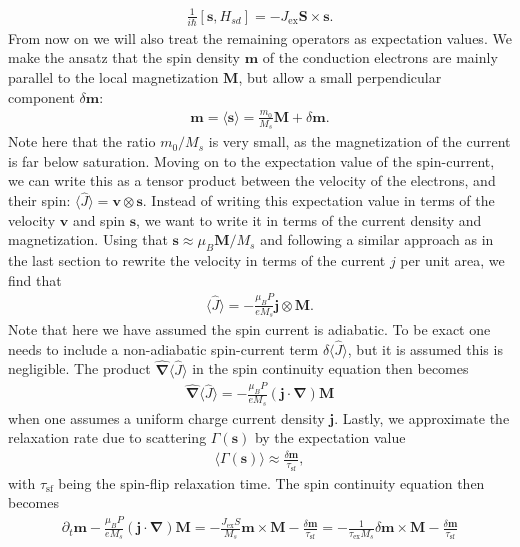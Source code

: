 \begin{align}
\frac{1}{i\hbar}\left[\mathbold{s}, H_{sd}\right] = -J_{\textrm{ex}}\mathbold{S}\times\mathbold{s}.
\end{align}
From now on we will also treat the remaining operators as expectation values. We make the ansatz that the spin density $\mathbold{m}$ of the conduction electrons are mainly parallel to the local magnetization $\mathbold{M}$, but allow a small perpendicular component $\delta\mathbold{m}$:
\begin{align}
    \mathbold{m} = \langle\mathbold{s}\rangle = \frac{m_0}{M_s} \mathbold{M} + \delta\mathbold{m}.
\end{align}
Note here that the ratio $m_0/M_s$ is very small, as the magnetization of the current is far below saturation. Moving on to the expectation value of the spin-current, we can write this as a tensor product between the velocity of the electrons, and their spin: $\langle\hat{J}\rangle = \mathbold{v}\otimes\mathbold{s}$. Instead of writing this expectation value in terms of the velocity $\mathbold{v}$ and spin $\mathbold{s}$, we want to write it in terms of the current density and magnetization. Using that $\mathbold{s} \approx \mu_B\mathbold{M}/M_s$ and following a similar approach as in the last section to rewrite the velocity in terms of the current $j$ per unit area, we find that
\begin{align}
\langle\hat{J}\rangle = -\frac{\mu_B P}{eM_s} \mathbold{j}\otimes\mathbold{M}.
\end{align}
Note that here we have assumed the spin current is adiabatic. To be exact one needs to include a non-adiabatic spin-current term $\delta\langle\hat{J}\rangle$, but it is assumed this is negligible. The product $\mathbold{\hat{\nabla}}\langle\hat{J}\rangle$ in the spin continuity equation then becomes
\begin{align}
\mathbold{\hat{\nabla}}\langle\hat{J}\rangle = -\frac{\mu_B P}{e M_s}\left(\mathbold{j}\cdot\mathbold{\nabla}\right)\mathbold{M}
\end{align}
when one assumes a uniform charge current density $\mathbold{j}$. Lastly, we approximate the relaxation rate due to scattering $\Gamma(\mathbold{s})$ by the expectation value 
\begin{align}
\langle\Gamma(\mathbold{s})\rangle \approx \frac{\delta\mathbold{m}}{\tau_{\textrm{sf}}},
\end{align}
with $\tau_{\textrm{sf}}$ being the spin-flip relaxation time. The spin continuity equation then becomes
\begin{align}
\partial_t\mathbold{m} -\frac{\mu_B P}{e M_s}\left(\mathbold{j}\cdot\mathbold{\nabla}\right)\mathbold{M} =   -\frac{J_{\textrm{ex}} S}{M_s}\mathbold{m}\times\mathbold{M} - \frac{\delta\mathbold{m}}{\tau_{\textrm{sf}}} =    -\frac{1}{\tau_{\textrm{ex}}M_s}\delta\mathbold{m}\times\mathbold{M} - \frac{\delta\mathbold{m}}{\tau_{\textrm{sf}}} \label{eq:SpinContinuityEq}
\end{align}
